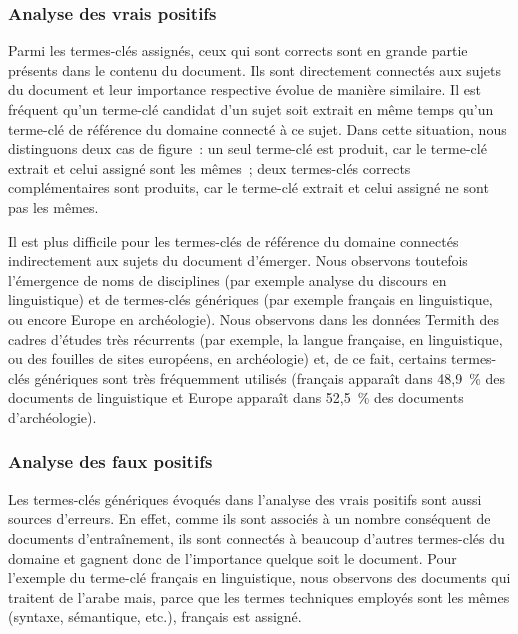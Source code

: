       \subsubsection{Analyse des vrais positifs}
      \label{subsec:main-domain_specific_keyphrase_annotation-supervised_automatic_keyphrase_annotation-error_analysis-true_positives}
        Parmi les termes-clés assignés, ceux qui sont corrects sont en grande
        partie présents dans le contenu du document. Ils sont directement
        connectés aux sujets du document et leur importance respective évolue de
        manière similaire. Il est fréquent qu'un terme-clé candidat d'un sujet
        soit extrait en même temps qu'un terme-clé de référence du domaine
        connecté à ce sujet. Dans cette situation, nous distinguons deux cas de
        figure~: un seul terme-clé est produit, car le terme-clé extrait et
        celui assigné sont les mêmes~; deux termes-clés corrects complémentaires
        sont produits, car le terme-clé extrait et celui assigné ne sont pas les
        mêmes.
        
        Il est plus difficile pour les termes-clés de référence du domaine
        connectés indirectement aux sujets du document d'émerger. Nous observons
        toutefois l'émergence de noms de disciplines (par exemple \og{}analyse
        du discours\fg{} en linguistique) et de termes-clés génériques (par
        exemple \og{}français\fg{} en linguistique, ou encore \og{}Europe\fg{}
        en archéologie). Nous observons dans les données Termith des cadres
        d'études très récurrents (par exemple, la langue française, en
        linguistique, ou des fouilles de sites européens, en archéologie) et, de
        ce fait, certains termes-clés génériques sont très fréquemment utilisés
        (\og{}français\fg{} apparaît dans 48,9~\% des documents de linguistique
        et \og{}Europe\fg{} apparaît dans 52,5~\% des documents d'archéologie).

      \subsubsection{Analyse des faux positifs}
      \label{subsec:main-domain_specific_keyphrase_annotation-supervised_automatic_keyphrase_annotation-error_analysis-false_positives}
        Les termes-clés génériques évoqués dans l'analyse des vrais positifs
        sont aussi sources d'erreurs. En effet, comme ils sont associés à un
        nombre conséquent de documents d'entraînement, ils sont connectés à
        beaucoup d'autres termes-clés du domaine et gagnent donc de l'importance
        quelque soit le document. Pour l'exemple du terme-clé \og{}français\fg{}
        en linguistique, nous observons des documents qui traitent de l'arabe
        mais, parce que les termes techniques employés sont les mêmes
        (\og{}syntaxe\fg{}, \og{}sémantique\fg{}, etc.), \og{}français\fg{} est
        assigné.

